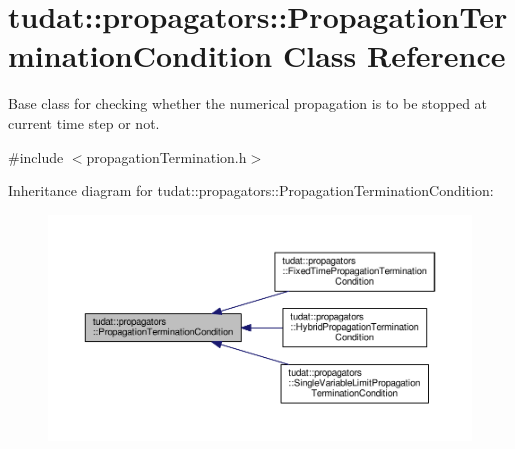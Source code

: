 \hypertarget{classtudat_1_1propagators_1_1PropagationTerminationCondition}{}\section{tudat\+:\+:propagators\+:\+:Propagation\+Termination\+Condition Class Reference}
\label{classtudat_1_1propagators_1_1PropagationTerminationCondition}


Base class for checking whether the numerical propagation is to be stopped at current time step or not.  




{\ttfamily \#include $<$propagation\+Termination.\+h$>$}



Inheritance diagram for tudat\+:\+:propagators\+:\+:Propagation\+Termination\+Condition\+:
\nopagebreak
\begin{figure}[H]
\begin{center}
\leavevmode
\includegraphics[width=350pt]{classtudat_1_1propagators_1_1PropagationTerminationCondition__inherit__graph}
\end{center}
\end{figure}
